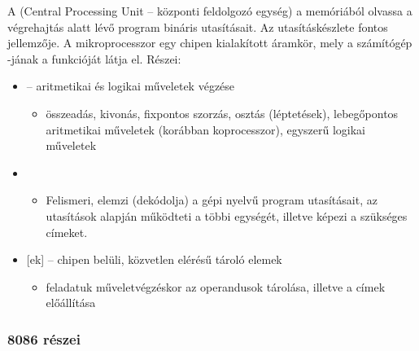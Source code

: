 \documentclass[../main.tex]{subfiles}
\begin{document}
A  (Central Processing Unit -- központi feldolgozó egység) a
memóriából olvassa a végrehajtás alatt lévő program bináris utasításait.
Az utasításkészlete fontos jellemzője. A mikroprocesszor egy chipen kialakított
áramkör, mely a számítógép -jának a funkcióját látja el. Részei:
\begin{itemize}
	\item {} -- aritmetikai és logikai műveletek végzése
	      \begin{itemize}
		      \item összeadás, kivonás,
		            fixpontos szorzás, osztás (léptetések),
		            lebegőpontos aritmetikai műveletek (korábban koprocesszor),
		            egyszerű logikai műveletek
	      \end{itemize}

	\item {}
	      \begin{itemize}
		      \item Felismeri, elemzi (dekódolja) a gépi nyelvű
		            program utasításait, az utasítások alapján működteti
		            a  többi egységét, illetve képezi a szükséges címeket.
	      \end{itemize}

	\item {}[ek] --
	      chipen belüli, közvetlen elérésű tároló elemek
	      \begin{itemize}
		      \item feladatuk műveletvégzéskor az operandusok tárolása,
		            illetve a címek előállítása
	      \end{itemize}
\end{itemize}

\subsubsection*{8086 részei}
\end{document}

